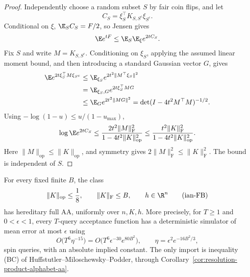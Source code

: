 \begin{proof}
Independently choose a random subset \(S\) by fair coin flips, and let
\[
 C_S=\xi_S^\top K_{S,S^c}\xi_{S^c}.
\]
Conditional on \(\xi\), \(\E_S C_S=F/2\), so Jensen gives
\[
 \E e^{tF}\le\E_S\E_\xi e^{2tC_S}.
\]
Fix \(S\) and write \(M=K_{S,S^c}\). Conditioning on \(\xi_S\), applying
the assumed linear moment bound, and then introducing a standard
Gaussian vector \(G\), gives
\[
 \begin{split}
 \E e^{2t\xi_S^\top M\xi_{S^c}}
 &\le\E_{\xi_S}e^{2t^2\|M^\top\xi_S\|^2}\\
 &=\E_{\xi_S,G}e^{2t\xi_S^\top MG}\\
 &\le\E_G e^{2t^2\|MG\|^2}
 =\det(I-4t^2M^\top M)^{-1/2}.
 \end{split}
\]
Using \(-\log(1-u)\le u/(1-u_{\max})\),
\[
 \log\E e^{2tC_S}
 \le\frac{2t^2\|M\|_{\mathrm F}^2}
          {1-4t^2\|K\|_{\mathrm{op}}^2}
 \le\frac{t^2\|K\|_{\mathrm F}^2}
          {1-4t^2\|K\|_{\mathrm{op}}^2}.
\]
Here \(\|M\|_{\mathrm{op}}\le\|K\|_{\mathrm{op}}\), and symmetry gives
\(2\|M\|_{\mathrm F}^2\le\|K\|_{\mathrm F}^2\).
The bound is independent of \(S\).
\end{proof}

\begin{theorem}
\label{ian:frobenius-full-aa}
For every fixed finite \(B\), the class
\[
 \|K\|_{\mathrm{op}}\le\frac18,\qquad
 \|K\|_{\mathrm F}\le B,\qquad h\in\R^n
 \tag{ian-FB}
\]
has hereditary full AA, uniformly over \(n,K,h\). More precisely, for
\(T\ge1\) and \(0<\epsilon<1\), every \(T\)-query acceptance function
has a deterministic simulator of mean error at most \(\epsilon\) using
\[
 O\bigl(T^6\eta^{-15}\bigr)
 =O\bigl(T^6\epsilon^{-30}e^{80B^2}\bigr),
 \qquad \eta=\epsilon^2e^{-16B^2/3},
 \tag{ian-FQ}
\]
spin queries, with an absolute implied constant. The only import is
inequality (BC) of Huffstutler--Miloschewsky--Podder, through
Corollary~\ref{cor:resolution-product-alphabet-aa}.
\end{theorem}

